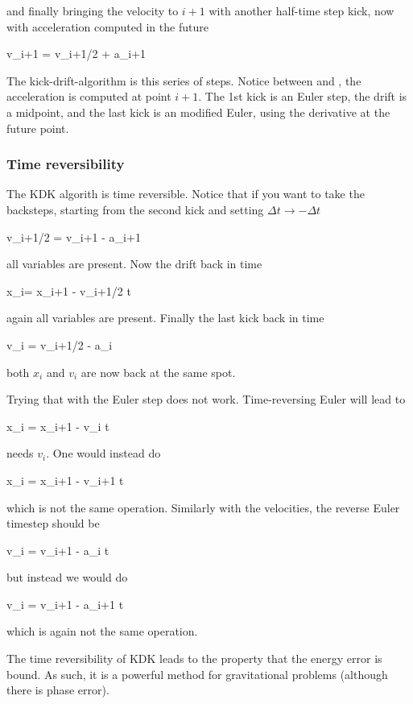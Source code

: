 \noindent and finally bringing the velocity to $i+1$ with another half-time step kick, now with acceleration computed in the future

\beq
v_{i+1} = v_{i+1/2} + a_{i+1}
\label{eq:kick2}
\eeq


The kick-drift-algorithm is this series of steps. Notice between  and , the acceleration is computed at point $i+1$. The 1st kick is an Euler step, the drift is a midpoint, and the last kick is an modified Euler, using the derivative at the future point. 

\subsubsection{Time reversibility}

The KDK algorith is time reversible. Notice that if you want to take the backsteps, starting from the second kick and setting $\Delta t \rightarrow -\Delta t$

\beq
v_{i+1/2} = v_{i+1} - a_{i+1}
\eeq

\noindent all variables are present. Now the drift back in time

\beq
x_{i}= x_{i+1} -	v_{i+1/2} \Delta t
\eeq

\noindent again all variables are present. Finally the last kick back in time

\beq
v_{i} = v_{i+1/2} - a_{i}
\eeq

\noindent both $x_i$ and $v_i$ are now back at the same spot. 


Trying that with the Euler step does not work. Time-reversing Euler will lead to

\beq
x_i = x_{i+1} - v_i \Delta t
\eeq

\noindent needs $v_i$. One would instead do 

\beq
x_i = x_{i+1} - v_{i+1} \Delta t
\eeq

\noindent which is not the same operation. Similarly with the velocities, the reverse Euler timestep should be

\beq
v_i = v_{i+1} - a_i \Delta t
\eeq

\noindent but instead we would do 

\beq
v_i = v_{i+1} - a_{i+1} \Delta t
\eeq

\noindent which is again not the same operation. 

The time reversibility of KDK leads to the property that the energy error is bound. As such, it is a powerful method for gravitational problems (although there is phase error). 

